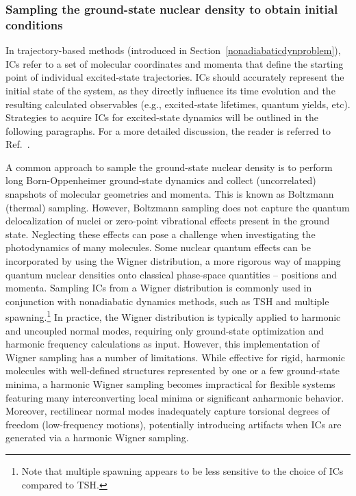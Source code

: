 \documentclass[9pt,bestpractices,pubversion]{livecoms}
\begin{document}
\subsubsection{Sampling the ground-state nuclear density to obtain initial conditions}
\label{sec:gssampling}

In trajectory-based methods (introduced in Section~\ref{nonadiabaticdynproblem}), ICs refer to a set of molecular coordinates and momenta that define the starting point of individual excited-state trajectories. ICs should accurately represent the initial state of the system, as they directly influence its time evolution and the resulting calculated observables (e.g., excited-state lifetimes, quantum yields, etc). Strategies to acquire ICs for excited-state dynamics will be outlined in the following paragraphs. For a more detailed discussion, the reader is referred to Ref.~. 

A common approach to sample the ground-state nuclear density is to perform long Born-Oppenheimer ground-state dynamics and collect (uncorrelated) snapshots of molecular geometries and momenta. This is known as Boltzmann (thermal) sampling. However, Boltzmann sampling does not capture the quantum delocalization of nuclei or zero-point vibrational effects present in the ground state.\cite{barbatti2016effects} Neglecting these effects can pose a challenge when investigating the photodynamics of many molecules. Some nuclear quantum effects can be incorporated by using the Wigner distribution,\cite{tannor_book,barbatti2016effects} a more rigorous way of mapping quantum nuclear densities onto classical phase-space quantities -- positions and momenta. Sampling ICs from a Wigner distribution is commonly used in conjunction with nonadiabatic dynamics methods, such as TSH and multiple spawning.\footnote{Note that multiple spawning appears to be less sensitive to the choice of ICs compared to TSH.\cite{ben2007continuous}} In practice, the Wigner distribution is typically applied to harmonic and uncoupled normal modes, requiring only ground-state optimization and harmonic frequency calculations as input. However, this implementation of Wigner sampling has a number of limitations.\cite{persico2014overview,mccoy2014role,suchan2018importance,mai2018novel,prlj2023deciphering} While effective for rigid, harmonic molecules with well-defined structures represented by one or a few ground-state minima, a harmonic Wigner sampling becomes impractical for flexible systems featuring many interconverting local minima or significant anharmonic behavior. Moreover, rectilinear normal modes inadequately capture torsional degrees of freedom (low-frequency motions), potentially introducing artifacts when ICs are generated via a harmonic Wigner sampling.\cite{mccoy2014role,mai2018novel,persico2014overview,prlj2023deciphering} 
\end{document}
